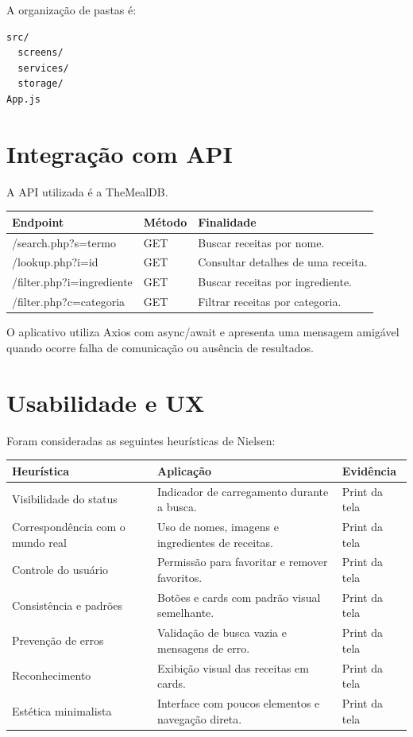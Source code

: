 \documentclass[12pt,a4paper]{article}
\begin{document}
A organização de pastas é:

\begin{verbatim}
src/
  screens/
  services/
  storage/
App.js
\end{verbatim}

\section{Integração com API}

A API utilizada é a TheMealDB.

\begin{longtable}{p{4cm}p{2cm}p{6cm}}
\toprule
Endpoint & Método & Finalidade\\
\midrule
/search.php?s=termo & GET & Buscar receitas por nome.\\
/lookup.php?i=id & GET & Consultar detalhes de uma receita.\\
/filter.php?i=ingrediente & GET & Buscar receitas por ingrediente.\\
/filter.php?c=categoria & GET & Filtrar receitas por categoria.\\
\bottomrule
\end{longtable}

O aplicativo utiliza Axios com async/await e apresenta uma mensagem amigável quando ocorre falha de comunicação ou ausência de resultados.

\section{Usabilidade e UX}

Foram consideradas as seguintes heurísticas de Nielsen:

\begin{longtable}{p{3cm}p{7cm}p{3cm}}
\toprule
Heurística & Aplicação & Evidência\\
\midrule
Visibilidade do status & Indicador de carregamento durante a busca. & Print da tela\\
Correspondência com o mundo real & Uso de nomes, imagens e ingredientes de receitas. & Print da tela\\
Controle do usuário & Permissão para favoritar e remover favoritos. & Print da tela\\
Consistência e padrões & Botões e cards com padrão visual semelhante. & Print da tela\\
Prevenção de erros & Validação de busca vazia e mensagens de erro. & Print da tela\\
Reconhecimento & Exibição visual das receitas em cards. & Print da tela\\
Estética minimalista & Interface com poucos elementos e navegação direta. & Print da tela\\
\bottomrule
\end{longtable}
\end{document}
